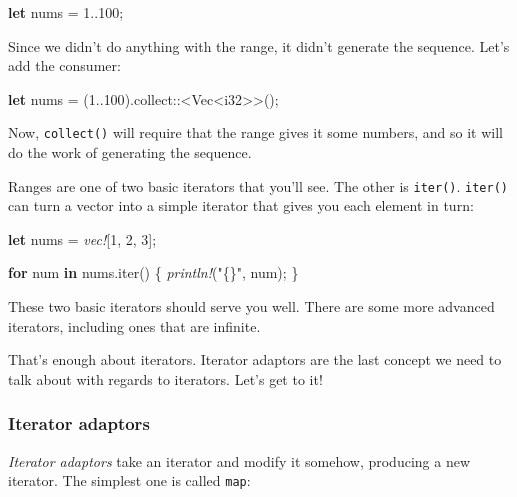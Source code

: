 \documentclass[a4paper,]{book}
\newenvironment{Shaded}{\begin{snugshade}}{\end{snugshade}}
\newcommand{\KeywordTok}[1]{\textcolor[rgb]{0.13,0.29,0.53}{\textbf{{#1}}}}
\newcommand{\DataTypeTok}[1]{\textcolor[rgb]{0.13,0.29,0.53}{{#1}}}
\newcommand{\DecValTok}[1]{\textcolor[rgb]{0.00,0.00,0.81}{{#1}}}
\newcommand{\StringTok}[1]{\textcolor[rgb]{0.31,0.60,0.02}{{#1}}}
\newcommand{\PreprocessorTok}[1]{\textcolor[rgb]{0.56,0.35,0.01}{\textit{{#1}}}}
\newcommand{\NormalTok}[1]{{#1}}
\begin{document}
\begin{Shaded}
\begin{Highlighting}[]
\KeywordTok{let} \NormalTok{nums = }\DecValTok{1.}\NormalTok{.}\DecValTok{100}\NormalTok{;}
\end{Highlighting}
\end{Shaded}

Since we didn't do anything with the range, it didn't generate the
sequence. Let's add the consumer:

\begin{Shaded}
\begin{Highlighting}[]
\KeywordTok{let} \NormalTok{nums = (}\DecValTok{1.}\NormalTok{.}\DecValTok{100}\NormalTok{).collect::<}\DataTypeTok{Vec}\NormalTok{<}\DataTypeTok{i32}\NormalTok{>>();}
\end{Highlighting}
\end{Shaded}

Now, \texttt{collect()} will require that the range gives it some
numbers, and so it will do the work of generating the sequence.

Ranges are one of two basic iterators that you'll see. The other is
\texttt{iter()}. \texttt{iter()} can turn a vector into a simple
iterator that gives you each element in turn:

\begin{Shaded}
\begin{Highlighting}[]
\KeywordTok{let} \NormalTok{nums = }\PreprocessorTok{vec!}\NormalTok{[}\DecValTok{1}\NormalTok{, }\DecValTok{2}\NormalTok{, }\DecValTok{3}\NormalTok{];}

\KeywordTok{for} \NormalTok{num }\KeywordTok{in} \NormalTok{nums.iter() \{}
   \PreprocessorTok{println!}\NormalTok{(}\StringTok{"\{\}"}\NormalTok{, num);}
\NormalTok{\}}
\end{Highlighting}
\end{Shaded}

These two basic iterators should serve you well. There are some more
advanced iterators, including ones that are infinite.

That's enough about iterators. Iterator adaptors are the last concept we
need to talk about with regards to iterators. Let's get to it!

\subsubsection{Iterator adaptors}\label{iterator-adaptors}

\emph{Iterator adaptors} take an iterator and modify it somehow,
producing a new iterator. The simplest one is called \texttt{map}:
\end{document}
